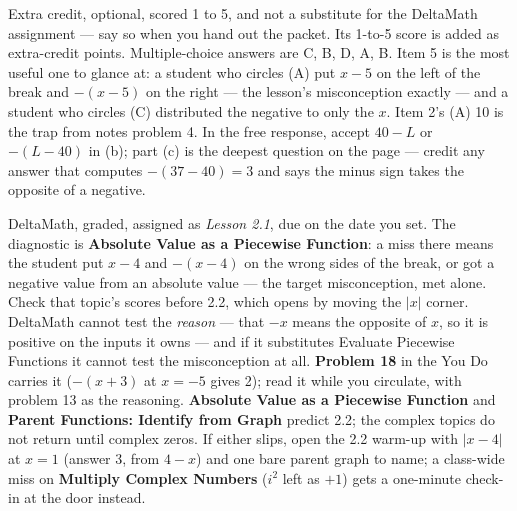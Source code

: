 \documentclass[10pt]{article}
\begin{document}
\begin{teachernote}[AP Practice]
Extra credit, optional, scored 1 to 5, and not a substitute for the DeltaMath assignment --- say so when you
hand out the packet. Its 1-to-5 score is added as extra-credit points. Multiple-choice answers are C, B, D, A, B. Item 5 is the most useful one to
glance at: a student who circles (A) put $x - 5$ on the left of the break and $-(x - 5)$ on the
right --- the lesson's misconception exactly --- and a student who circles (C) distributed the
negative to only the $x$. Item 2's (A) 10 is the trap from notes problem 4. In the free
response, accept $40 - L$ or $-(L - 40)$ in (b); part (c) is the deepest question on the page
--- credit any answer that computes $-(37 - 40) = 3$ and says the minus sign takes the
opposite of a negative.
\end{teachernote}

\begin{teachernote}[Homework]
DeltaMath, graded, assigned as \textit{Lesson 2.1}, due on the date you set. The diagnostic is
\textbf{Absolute Value as a Piecewise Function}: a miss there means the student put $x - 4$ and
$-(x - 4)$ on the wrong sides of the break, or got a negative value from an absolute value ---
the target misconception, met alone. Check that topic's scores before 2.2, which opens by moving
the $|x|$ corner. DeltaMath cannot test the \textit{reason} --- that $-x$ means the opposite of
$x$, so it is positive on the inputs it owns --- and if it substitutes Evaluate Piecewise
Functions it cannot test the misconception at all. \textbf{Problem 18} in the You Do carries it
($-(x + 3)$ at $x = -5$ gives 2); read it while you circulate, with problem 13 as the reasoning.
\textbf{Absolute Value as a Piecewise Function} and \textbf{Parent Functions: Identify from
Graph} predict 2.2; the complex topics do not return until complex zeros. If either slips,
open the 2.2 warm-up with $|x - 4|$ at $x = 1$ (answer 3, from $4 - x$) and one bare parent
graph to name; a class-wide miss on \textbf{Multiply Complex Numbers} ($i^2$ left as $+1$)
gets a one-minute check-in at the door instead.
\end{teachernote}
\end{document}
